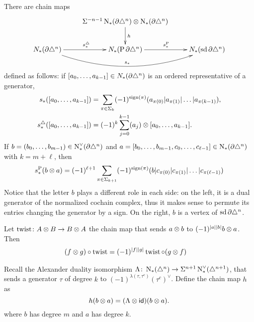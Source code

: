 There are chain maps
\[
\xymatrix{
	&\susp{-n-1}\chains(\partial\simplex^n) \ot \chains(\partial\simplex^n)\ar[d]^h& \\
	\cadenas(\partial\simplex^n)\ar[r]^{s_*^{\simplex}}\ar@/_2.0pc/[rr]^{s_*} & \cadenas(\Psd \partial\simplex^n)\ar[r]^{s^{\Psd}_*} & \cadenas(\sd\partial\simplex^n)
}
\]
defined as follows: if $[a_0,\dots,a_{k-1}]\in N_{*}(\partial\triangle^n)$ is an ordered representative of a generator,
\begin{align*}
	s_*([a_0,\dots,a_{k-1}]) &= \sum_{\pi\in \Sigma_{k}} (-1)^{\operatorname{sign}(\pi)}(a_{\pi(0)}|a_{\pi(1)}|\dots|a_{\pi(k-1)}),
	\\
	s_*^{\triangle}([a_0,\dots,a_{k-1}]) &= (-1)^{k}\sum_{j=0}^{k-1} (a_j) \otimes [a_0,\dots,a_{k-1}].
\end{align*}
If $b = (b_0,\dots,b_{m-1})\in \operatorname{N}^\vee_{*}(\partial\triangle^n)$ and $a = [b_0,\dots,b_{m-1},c_0,\dots,c_{\ell-1}]\in \operatorname{N}_{*}(\partial\triangle^n)$ with $k = m+\ell$, then
\begin{equation}\label{eq:sP}
	s_*^{\operatorname{P}}(b \otimes a) = (-1)^{\ell+1}\sum_{\pi\in \Sigma_{k+1}} (-1)^{\operatorname{sign}(\pi)} (b|c_{\pi(0)}|c_{\pi(1)}|\dots|c_{\pi(\ell-1)})
\end{equation}
Notice that the letter $b$ plays a different role in each side: on the left, it is a dual generator of the normalized cochain complex, thus it makes sense to permute its entries changing the generator by a sign. On the right, $b$ is a vertex of $\operatorname{sd}\partial\triangle^n$.

\begin{remark}
	Let $\operatorname{twist} \colon A \otimes B \to B \otimes A$ the chain map that sends $a \otimes b$ to $(-1)^{|a||b|}b \otimes a$. Then
	\begin{align*}
		(f \otimes g)\circ \operatorname{twist} &= (-1)^{|f||g|}\operatorname{twist} \circ (g \otimes f)
	\end{align*}
\end{remark}

Recall the Alexander duality isomorphism $\Lambda \colon \operatorname{N}_{*}(\triangle^n) \to \Sigma^{n+1}\operatorname{N}^\vee_{*}(\triangle^{n+1})$, that sends a generator $\tau$ of degree $k$ to $(-1)^{\lambda(\tau,\tau^c)} (\tau^c)^{\vee}$. Define the chain map $h$ as
\[
h( b \otimes a) = (\Lambda \otimes \mathsf{id})(b \otimes a).
\]
where $b$ has degree $m$ and $a$ has degree $k$.

